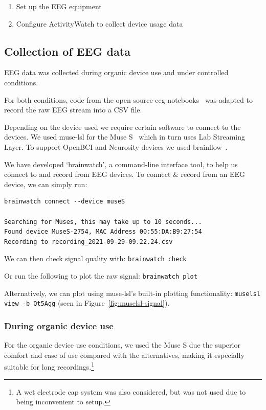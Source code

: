 \begin{enumerate}
    \item Set up the EEG equipment
    \item Configure ActivityWatch to collect device usage data
\end{enumerate}

    \subsection{Collection of EEG data}

        EEG data was collected during organic device use and under controlled conditions.

        For both conditions, code from the open source eeg-notebooks~\cite{barachant_eeg-notebooks_2020} was adapted to record the raw EEG stream into a CSV file.

        Depending on the device used we require certain software to connect to the devices. We used muse-lsl for the Muse S~\cite{muse-lsl} which in turn uses Lab Streaming Layer. To support OpenBCI and Neurosity devices we used brainflow~\cite{noauthor_brainflow_2020}.

        We have developed `brainwatch', a command-line interface tool, to help us connect to and record from EEG devices. To connect \& record from an EEG device, we can simply run:

\begin{verbatim}
brainwatch connect --device museS

Searching for Muses, this may take up to 10 seconds...
Found device MuseS-2754, MAC Address 00:55:DA:B9:27:54
Recording to recording_2021-09-29-09.22.24.csv
\end{verbatim}

        We can then check signal quality with: \texttt{brainwatch check}

        Or run the following to plot the raw signal: \texttt{brainwatch plot}

        Alternatively, we can plot using muse-lsl's built-in plotting functionality: \texttt{muselsl view -b Qt5Agg} (seen in Figure~\ref{fig:muselsl-signal}).

        \subsubsection*{During organic device use}

            For the organic device use conditions, we used the Muse S due the superior comfort and ease of use compared with the alternatives, making it especially suitable for long recordings.\footnote{A wet electrode cap system was also considered, but was not used due to being inconvenient to setup.}

